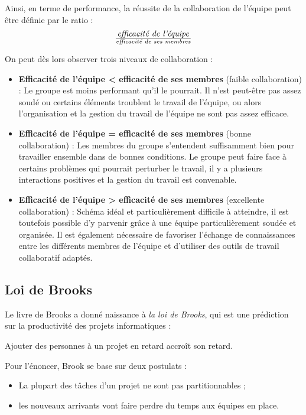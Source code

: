 Ainsi, en terme de performance, la réussite de la collaboration de l'équipe peut être définie par le ratio : \[\text{\textit{efficacité de l'équipe}} \over \text{\textit{efficacité de ses membres}}\]

On peut dès lors observer trois niveaux de collaboration :\\

\begin{itemize}

\item \textbf{Efficacité de l'équipe \textless \: efficacité de ses membres} (faible collaboration) :
Le groupe est moins performant qu'il le pourrait. Il n'est peut-être pas assez soudé ou certains éléments troublent le travail de l'équipe, ou alors l'organisation et la gestion du travail de l'équipe ne sont pas assez efficace.\\

\item \textbf{Efficacité de l'équipe = efficacité de ses membres} (bonne collaboration) :
Les membres du groupe s'entendent suffisamment bien pour travailler ensemble dans de bonnes conditions. Le groupe peut faire face à certains problèmes qui pourrait perturber le travail, il y a plusieurs interactions positives et la gestion du travail est convenable.\\

\item \textbf{Efficacité de l'équipe \textgreater \: efficacité de ses membres} (excellente collaboration) :
Schéma idéal et particulièrement difficile à atteindre, il est toutefois possible d'y parvenir grâce à une équipe particulièrement soudée et organisée. Il est également nécessaire de favoriser l'échange de connaissances entre les différents membres de l'équipe et d'utiliser des outils de travail collaboratif adaptés.

\end{itemize}

\subsection{Loi de Brooks}
Le livre de Brooks a donné naissance à \textit{la loi de Brooks}, qui est une prédiction sur la productivité des projets informatiques :

\begin{Quote}
Ajouter des personnes à un projet en retard accroît son retard.
\end{Quote}

Pour l'énoncer, Brook se base sur deux postulats :
\begin{itemize}
\item La plupart des tâches d'un projet ne sont pas partitionnables ;
\item les nouveaux arrivants vont faire perdre du temps aux équipes en place.
\end{itemize}

